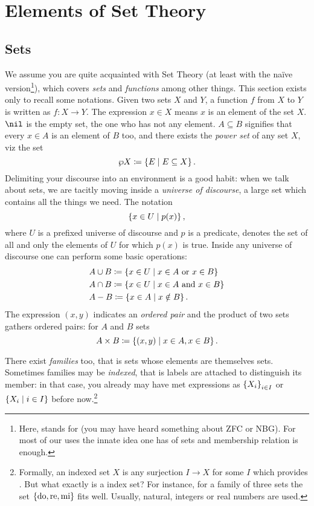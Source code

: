 
\section{Elements of Set Theory}

\subsection{Sets}

We assume you are quite acquainted with Set Theory (at least with the na\"ive version\footnote{Here,  stands for  (you may have heard something about ZFC or NBG). For most of our uses the innate idea one has of sets and membership relation is enough.}), which covers {\em sets} and {\em functions} among other things. This section exists only to recall some notations. Given two sets \(X\) and \(Y\), a function \(f\) from \(X\) to \(Y\) is written as \(f : X \to Y\). The expression \(x \in X\) means \(x\) is an element of the set \(X\). \(\nil\) is the empty set, the one who has not any element. \(A \subseteq B\) signifies that every \(x \in A\) is an element of \(B\) too, and there exists the {\em power set} of any set \(X\), viz the set
\[\wp X \coloneq \left\{E \mid E \subseteq X\right\}.\]
Delimiting your discourse into an environment is a good habit: when we talk about sets, we are tacitly moving inside a {\em universe of discourse}, a large set which contains all the things we need. The notation
\[\left\{x \in U \mid p(x)\right\},\]
where \(U\) is a prefixed universe of discourse and \(p\) is a predicate, denotes the set of all and only the elements of \(U\) for which \(p(x)\) is true. Inside any universe of discourse one can perform some basic operations:
\begin{align*}
& A \cup B \coloneq \left\{x \in U \mid x \in A \text{ or } x \in B\right\} \\
& A \cap B \coloneq \left\{x \in U \mid x \in A \text{ and } x \in B\right\}\\
& A - B \coloneq \left\{x \in A \mid x \notin B\right\}.
\end{align*}
The expression \((x, y)\) indicates an {\em ordered pair} and the product of two sets gathers ordered pairs: for \(A\) and \(B\) sets
\[A \times B \coloneq \left\{(x, y) \mid x \in A, x \in B\right\}.\]

There exist {\em families} too, that is sets whose elements are themselves sets. Sometimes families may be {\em indexed}, that is labels are attached to distinguish its member: in that case, you already may have met expressions as \(\left\{X_i\right\}_{i \in I}\) or \(\left\{X_i \mid i \in I\right\}\) before now.\footnote{Formally, an indexed set \(X\) is any surjection \(I \to X\) for some \(I\) which provides . But what exactly is a index set? For instance, for a family of three sets the set \(\left\{\text{do}, \text{re}, \text{mi}\right\}\) fits well. Usually, natural, integers or real numbers are used.}

